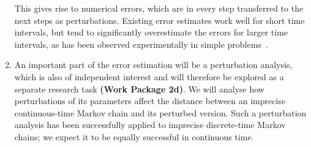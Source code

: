 \documentclass[11pt,dvipsnames,usenames,a4paper]{article}
\begin{document}
\begin{enumerate}[label=\tiny$\blacksquare$,leftmargin=*,noitemsep]
This gives rise to numerical errors, which are in every step transferred to the next steps as perturbations. 
Existing error estimates work well for short time intervals, but tend to significantly overestimate the errors for larger time intervals, as has been observed experimentally in simple problems~\cite{erreygers2017:ictmcs,skulj2015}.
\item An important part of the error estimation will be a perturbation analysis, which is also of independent interest and will therefore be explored as a separate research task {\bf(Work Package 2d)}.
We will analyse how perturbations of its parameters affect the distance between an imprecise continuous-time Markov chain and its perturbed version.
Such a perturbation analysis has been successfully applied to imprecise discrete-time Markov chains; we expect it to be equally successful in continuous time.
\end{enumerate}
%
%
%
%
%
%
%
%
%
%
%
%
%
%
%
%
\end{document}
